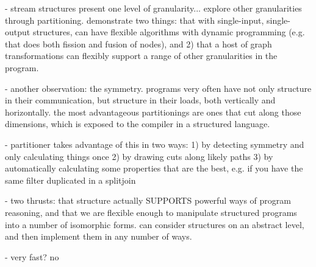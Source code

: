 - stream structures present one level of granularity... explore other
granularities through partitioning.  demonstrate two things: that with
single-input, single-output structures, can have flexible algorithms
with dynamic programming (e.g. that does both fission and fusion of
nodes), and 2) that a host of graph transformations can flexibly
support a range of other granularities in the program.

- another observation: the symmetry.  programs very often have not
only structure in their communication, but structure in their loads,
both vertically and horizontally.  the most advantageous partitionings
are ones that cut along those dimensions, which is exposed to the
compiler in a structured language.

  - partitioner takes advantage of this in two ways: 
    1) by detecting symmetry and only calculating things once
    2) by drawing cuts along likely paths
    3) by automatically calculating some properties that are the best,
       e.g. if you have the same filter duplicated in a splitjoin

- two thrusts: that structure actually SUPPORTS powerful ways of
program reasoning, and that we are flexible enough to manipulate
structured programs into a number of isomorphic forms.  can consider
structures on an abstract level, and then implement them in any number
of ways.

- very fast?  no
